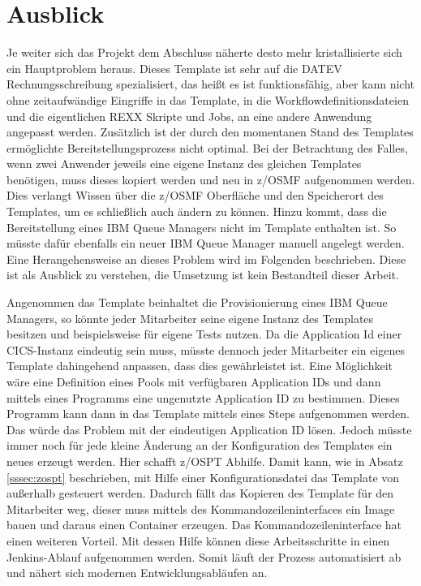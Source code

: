 \chapter{Ausblick}\label{ch:ausblick}
Je weiter sich das Projekt dem Abschluss näherte desto mehr kristallisierte sich ein Hauptproblem heraus.
Dieses Template ist sehr auf die DATEV Rechnungsschreibung spezialisiert, das heißt es ist funktionsfähig, aber kann nicht ohne zeitaufwändige Eingriffe in das Template, in die Workflowdefinitionsdateien und die eigentlichen REXX Skripte und Jobs, an eine andere Anwendung angepasst werden.
Zusätzlich ist der durch den momentanen Stand des Templates ermöglichte Bereitstellungsprozess nicht optimal.
Bei der Betrachtung des Falles, wenn zwei Anwender jeweils eine eigene Instanz des gleichen Templates benötigen, muss dieses kopiert werden und neu in z/OSMF aufgenommen werden.
Dies verlangt Wissen über die z/OSMF Oberfläche und den Speicherort des Templates, um es schließlich auch ändern zu können.
Hinzu kommt, dass die Bereitstellung eines IBM Queue Managers nicht im Template enthalten ist.
So müsste dafür ebenfalls ein neuer IBM Queue Manager manuell angelegt werden.
Eine Herangehensweise an dieses Problem wird im Folgenden beschrieben.
Diese ist als Ausblick zu verstehen, die Umsetzung ist kein Bestandteil dieser Arbeit.

Angenommen das Template beinhaltet die Provisionierung eines IBM Queue Managers, so könnte jeder Mitarbeiter seine eigene Instanz des Templates besitzen und beispielsweise für eigene Tests nutzen.
Da die Application Id einer CICS-Instanz eindeutig sein muss, müsste dennoch jeder Mitarbeiter ein eigenes Template dahingehend anpassen, dass dies gewährleistet ist.
Eine Möglichkeit wäre eine Definition eines Pools mit verfügbaren Application IDs und dann mittels eines Programms eine ungenutzte Application ID zu bestimmen.
Dieses Programm kann dann in das Template mittels eines Steps aufgenommen werden.
Das würde das Problem mit der eindeutigen Application ID lösen.
Jedoch müsste immer noch für jede kleine Änderung an der Konfiguration des Templates ein neues erzeugt werden.
Hier schafft z/OSPT Abhilfe.
Damit kann, wie in Absatz \ref{sssec:zospt} beschrieben, mit Hilfe einer Konfigurationsdatei das Template von außerhalb gesteuert werden.
Dadurch fällt das Kopieren des Template für den Mitarbeiter weg, dieser muss mittels des Kommandozeileninterfaces ein Image bauen und daraus einen Container erzeugen.
Das Kommandozeileninterface hat einen weiteren Vorteil.
Mit dessen Hilfe können diese Arbeitsschritte in einen Jenkins-Ablauf aufgenommen werden.
Somit läuft der Prozess automatisiert ab und nähert sich modernen Entwicklungsabläufen an.

